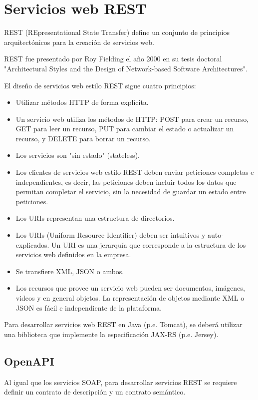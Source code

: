 \section{Servicios web REST}

REST (REpresentational State Transfer) define un conjunto de principios arquitectónicos para la creación de servicios web.

REST fue presentado por Roy Fielding el año 2000 en su tesis doctoral "Architectural Styles and the Design of Network-based Software Architectures".

El diseño de servicios web estilo REST sigue cuatro principios:

\begin{itemize}
\item Utilizar métodos HTTP de forma explícita.
\item Un servicio web utiliza los métodos de HTTP: POST para crear un recurso, GET para leer un recurso, PUT para cambiar el estado o actualizar un recurso, y DELETE para borrar un recurso.
\item Los servicios son "sin estado" (stateless).
\item Los clientes de servicios web estilo REST deben enviar peticiones completas e independientes, es decir, las peticiones deben incluir todos los datos que permitan completar el servicio, sin la necesidad de guardar un estado entre peticiones.
\item Los URIs representan una estructura de directorios.
\item Los URIs (Uniform Resource Identifier) deben ser intuitivos y auto-explicados. Un URI es una jerarquía que corresponde a la estructura de los servicios web definidos en la empresa.
\item Se transfiere XML, JSON o ambos.
\item Los recursos que provee un servicio web pueden ser documentos, imágenes, videos y en general objetos. La representación de objetos mediante XML o JSON es fácil e independiente de la plataforma.
\end{itemize}

Para desarrollar servicios web REST en Java (p.e. Tomcat), se deberá utilizar una biblioteca que implemente la especificación JAX-RS (p.e. Jersey).

\subsection{OpenAPI}

Al igual que los servicios SOAP, para desarrollar servicios REST se requiere definir un contrato de descripción y un contrato semántico.

